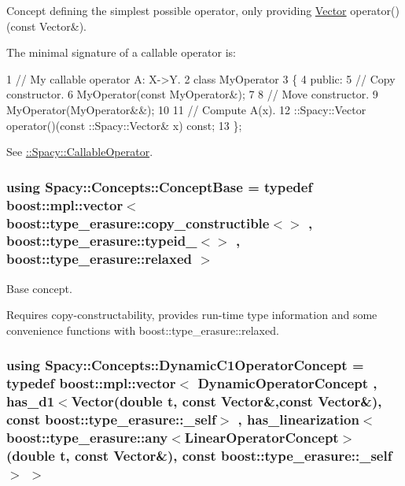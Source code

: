 Concept defining the simplest possible operator, only providing \hyperlink{classSpacy_1_1Vector}{Vector} operator()(const Vector\&). 

\label{group__ConceptGroup_gadec0c664abaacc2065dadd8b11cc8d30_CallableOperatorConceptAnchor}%
\hypertarget{group__ConceptGroup_gadec0c664abaacc2065dadd8b11cc8d30_CallableOperatorConceptAnchor}{}%
The minimal signature of a callable operator is\+: 
\begin{DoxyCode}
1 // My callable operator A: X->Y.
2 class MyOperator
3 \{
4 public:
5   // Copy constructor.
6   MyOperator(const MyOperator&);
7 
8   // Move constructor.
9   MyOperator(MyOperator&&);
10 
11   // Compute A(x).
12   ::Spacy::Vector operator()(const ::Spacy::Vector& x) const;
13 \};
\end{DoxyCode}


See \hyperlink{group__SpacyGroup_ga2b74020d806ad800795cdd97dab3466f_CallableOperatorAnchor}{\+:\+:Spacy\+:\+:Callable\+Operator}. \hypertarget{group__ConceptGroup_ga63426675cc05ccce03ead56a4fa90d96_ga63426675cc05ccce03ead56a4fa90d96}{}
\subsubsection[{Concept\+Base}]{\setlength{\rightskip}{0pt plus 5cm}using {\bf Spacy\+::\+Concepts\+::\+Concept\+Base} = typedef boost\+::mpl\+::vector$<$ boost\+::type\+\_\+erasure\+::copy\+\_\+constructible$<$$>$ , boost\+::type\+\_\+erasure\+::typeid\+\_\+$<$$>$ , boost\+::type\+\_\+erasure\+::relaxed $>$}\label{group__ConceptGroup_ga63426675cc05ccce03ead56a4fa90d96_ga63426675cc05ccce03ead56a4fa90d96}


Base concept. 

Requires copy-\/constructability, provides run-\/time type information and some convenience functions with boost\+::type\+\_\+erasure\+::relaxed. \hypertarget{group__ConceptGroup_gaa7ef0ce2d66b0610035541b580564b11_gaa7ef0ce2d66b0610035541b580564b11}{}
\subsubsection[{Dynamic\+C1\+Operator\+Concept}]{\setlength{\rightskip}{0pt plus 5cm}using {\bf Spacy\+::\+Concepts\+::\+Dynamic\+C1\+Operator\+Concept} = typedef boost\+::mpl\+::vector$<$ Dynamic\+Operator\+Concept , has\+\_\+d1$<$Vector(double t, const Vector\&,const Vector\&), const boost\+::type\+\_\+erasure\+::\+\_\+self$>$ , has\+\_\+linearization$<$boost\+::type\+\_\+erasure\+::any$<$Linear\+Operator\+Concept$>$(double t, const Vector\&), const boost\+::type\+\_\+erasure\+::\+\_\+self$>$ $>$}\label{group__ConceptGroup_gaa7ef0ce2d66b0610035541b580564b11_gaa7ef0ce2d66b0610035541b580564b11}


